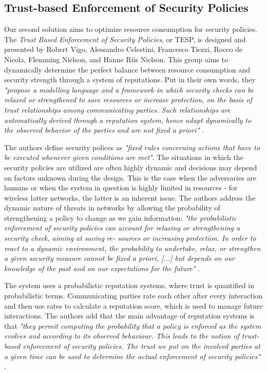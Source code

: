 \documentclass[12pt,a4paper,twoside]{report}
\begin{document}
\subsection{Trust-based Enforcement of Security Policies}
Our second solution aims to optimize resource consumption for security policies. The \emph{Trust Based Enforcement of Security Policies}, or TESP, is designed and presented by Robert Vigo, Alessandro Celestini, Francesco Tiezzi, Rocco de Nicola, Flemming Nielson, and Hanne Riis Nielson\cite{vigo;etal:2014}. This group aims to dynamically determine the perfect balance between resource consumption and security strength through a system of reputations. Put in their own words, they \emph{"propose a modelling language and a framework in which security checks can be relaxed or strengthened to save resources or increase protection, on the basis of trust relationships among communicating parties. Such relationships are automatically derived through a reputation system, hence adapt dynamically to the observed behavior of the parties and are not fixed a priori"} \cite{vigo;etal:2014}.\par
The authors define security polices as \emph{"fixed rules concerning actions that have to be executed whenever given conditions are met"}. The situations in which the security policies are utilized are often highly dynamic and decisions may depend on factors unknown during the design. This is the case when the adversaries are humans or when the system in question is highly limited in resources - for wireless latter networks, the latter is an inherent issue. The authors address the dynamic nature of threats in networks by allowing the probability of strengthening a policy to change as we gain information: \emph{"the probabilistic enforcement of security policies can account for relaxing or strengthening a security check, aiming at saving re- sources or increasing protection. In order to react to a dynamic environment, the probability to undertake, relax, or strengthen a given security measure cannot be fixed a priori, [...] but depends on our knowledge of the past and on our expectations for the future"} \cite{vigo;etal:2014}.\par
The system uses a probabilistic reputation systems, where trust is quantified in probabilistic terms. Communicating parties rate each other after every interaction and then use rates to calculate a reputation score, which is used to manage future interactions. The authors add that the main advantage of reputation systems is that \emph{"they permit computing the probability that a policy is enforced as the system evolves and according to its observed behaviour. This leads to the notion of trust-based enforcement of security policies. The trust we put on the involved parties at a given time can be used to determine the actual enforcement of security policies"} \cite{vigo;etal:2014}.\par
\end{document}
